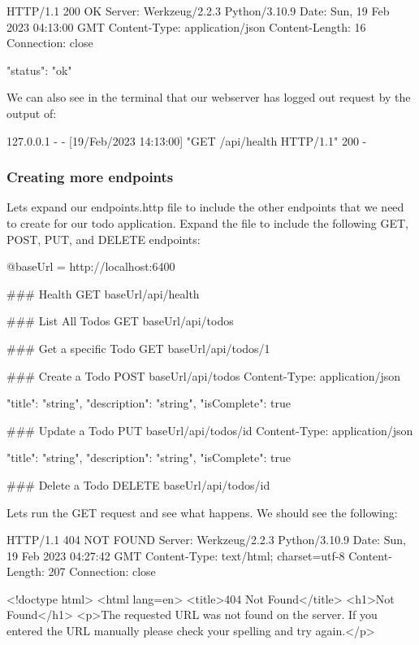 \documentclass{csse4400}
\begin{document}
\begin{code}[language=json,numbers=none]{}
HTTP/1.1 200 OK
Server: Werkzeug/2.2.3 Python/3.10.9
Date: Sun, 19 Feb 2023 04:13:00 GMT
Content-Type: application/json
Content-Length: 16
Connection: close
  
{
  "status": "ok"
}
\end{code}

We can also see in the terminal that our webserver has logged out request by the output of:

\begin{code}[language=bash,numbers=none]{}
127.0.0.1 - - [19/Feb/2023 14:13:00] "GET /api/health HTTP/1.1" 200 -
\end{code}

\subsubsection{Creating more endpoints}

Lets expand our endpoints.http file to include the other endpoints that we need to create for our todo application. Expand the file to include the following GET, POST, PUT, and DELETE endpoints:

\begin{code}[numbers=none]{}
  @baseUrl = http://localhost:6400

  ### Health
  GET {{baseUrl}}/api/health
  
  ### List All Todos
  GET {{baseUrl}}/api/todos
  
  ### Get a specific Todo
  GET {{baseUrl}}/api/todos/1
  
  ### Create a Todo
  POST {{baseUrl}}/api/todos
  Content-Type: application/json
  
  {
      "title": "string",
      "description": "string",
      "isComplete": true
  }
  
  ### Update a Todo
  PUT {{baseUrl}}/api/todos/{id}
  Content-Type: application/json
  
  {
      "title": "string",
      "description": "string",
      "isComplete": true
  }
  
  ### Delete a Todo
  DELETE {{baseUrl}}/api/todos/{id}
  
\end{code}

Lets run the GET request and see what happens. We should see the following:

\begin{code}[language=json,numbers=none]{}
  HTTP/1.1 404 NOT FOUND
  Server: Werkzeug/2.2.3 Python/3.10.9
  Date: Sun, 19 Feb 2023 04:27:42 GMT
  Content-Type: text/html; charset=utf-8
  Content-Length: 207
  Connection: close
  
  <!doctype html>
  <html lang=en>
  <title>404 Not Found</title>
  <h1>Not Found</h1>
  <p>The requested URL was not found on the server. If you entered the URL manually please check your spelling and try again.</p>  
\end{code}
\end{document}
